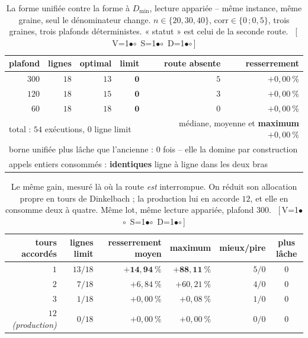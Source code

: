 \documentclass[11pt,a4paper]{article}
\theoremstyle{plain}
\theoremstyle{remark}
\newcommand{\cfgm}[1]{\ifnum#1=1$\bullet$\else$\circ$\fi}
\newcommand{\conf}[3]{%
  \textsf{\footnotesize[\,V\cfgm{#1}\ S\cfgm{#2}\ D\cfgm{#3}\,]}}
\begin{document}
\begin{table}[H]
\centering
\caption{La forme unifiée contre la forme à $D_{\min}$, lecture appariée --
même instance, même graine, seul le dénominateur change. $n\in\{20,30,40\}$,
$\text{corr}\in\{0\,;0{,}5\}$, trois graines, trois plafonds déterministes.
« statut » est celui de la seconde route.\ \conf{1}{1}{1}}
\label{tab:unifie}
\begin{tabular}{rrrrrr}
\toprule
plafond & lignes & \textsf{optimal} & \textsf{limit} & route absente
 & resserrement\\
\midrule
$300$ & $18$ & $13$ & $\mathbf{0}$ & $5$ & $+0{,}00\ \%$\\
$120$ & $18$ & $15$ & $\mathbf{0}$ & $3$ & $+0{,}00\ \%$\\
$60$  & $18$ & $18$ & $\mathbf{0}$ & $0$ & $+0{,}00\ \%$\\
\midrule
\multicolumn{4}{l}{total : $54$ exécutions, $0$ ligne \textsf{limit}}
 & \multicolumn{2}{r}{médiane, moyenne et \textbf{maximum} $+0{,}00\ \%$}\\
\multicolumn{6}{l}{borne unifiée plus lâche que l'ancienne : $0$ fois
 -- elle la domine par construction}\\
\multicolumn{6}{l}{appels entiers consommés : \textbf{identiques} ligne à
 ligne dans les deux bras}\\
\bottomrule
\end{tabular}
\end{table}

\begin{table}[H]
\centering
\caption{Le même gain, mesuré là où la route \emph{est} interrompue. On
réduit son allocation propre en tours de Dinkelbach ; la production lui en
accorde $12$, et elle en consomme deux à quatre. Même lot, même lecture
appariée, plafond $300$.\ \conf{1}{1}{1}}
\label{tab:unifiecoupe}
\begin{tabular}{rrrrrc}
\toprule
tours accordés & lignes \textsf{limit} & resserrement moyen & maximum
 & mieux/pire & plus lâche\\
\midrule
$1$  & $13/18$ & $\mathbf{+14{,}94\ \%}$ & $\mathbf{+88{,}11\ \%}$
 & $5/0$ & $0$\\
$2$  & $7/18$  & $+6{,}84\ \%$ & $+60{,}21\ \%$ & $4/0$ & $0$\\
$3$  & $1/18$  & $+0{,}00\ \%$ & $+0{,}08\ \%$ & $1/0$ & $0$\\
$12$ \emph{(production)} & $0/18$ & $+0{,}00\ \%$ & $+0{,}00\ \%$
 & $0/0$ & $0$\\
\bottomrule
\end{tabular}
\end{table}
\end{document}
